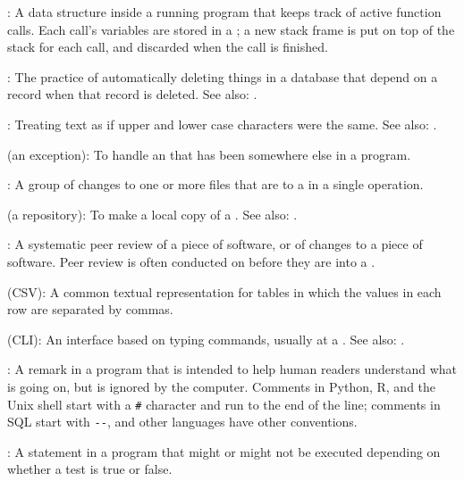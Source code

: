 :
A data structure inside a running program that
keeps track of active function calls. Each call's variables are stored
in a ; a new stack frame is put on
top of the stack for each call, and discarded when the call is finished.

:
The practice of automatically deleting things
in a database that depend on a record when that record is deleted. See
also: .

:
Treating text as if upper and lower case
characters were the same. See also: .
 
 (an exception):
To handle an  that has been 
somewhere else in a program.

:
A group of changes to one or more files that are
 to a   in a single operation.

 (a repository):
To make a local copy of a  .
See also: .

:
A systematic peer review of a piece of software,
or of changes to a piece of software.
Peer review is often conducted on 
before they are  into a .

 (CSV):
A common textual representation
for tables in which the values in each row are separated by commas.

 (CLI):
An interface based on typing
commands, usually at a . See also:
.

:
A remark in a program that is intended to help human
readers understand what is going on, but is ignored by the computer.
Comments in Python, R, and the Unix shell start with a \texttt{\#}
character and run to the end of the line; comments in SQL start with
\texttt{-{}-}, and other languages have other conventions.

:
A statement in a program that might or
might not be executed depending on whether a test is true or false.

